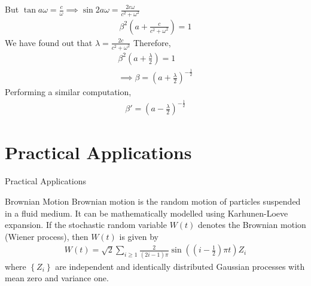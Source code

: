 \documentclass{beamer}
\providecommand{\brak}[1]{\ensuremath{\left(#1\right)}}
\providecommand{\cbrak}[1]{\ensuremath{\left\{#1\right\}}}
\begin{document}
	\begin{frame}
	But $\tan a\omega = \frac{c}{\omega} \implies \sin2 a\omega = \frac{2c\omega}{c^2+\omega^2}$
	\begin{align}
		\beta^2\brak{a + \frac{c}{c^2+\omega^2}} = 1
	\end{align}
	We have found out that $\lambda = \frac{2c}{c^2+\omega^2}$
	Therefore,
	\begin{align}
		\beta^2 \brak{a + \frac{\lambda}{2}} = 1 \\
		\implies \beta = \brak{a + \frac{\lambda}{2}}^{-\frac12}
	\end{align}
	Performing a similar computation,
	\begin{align}
		\beta' = \brak{a - \frac{\lambda}{2}}^{-\frac12}
	\end{align}
	\end{frame}
	
	\section{Practical Applications}
	\begin{frame}{Practical Applications}
	\begin{block}{Brownian Motion}
		Brownian motion is the random motion of particles suspended in a fluid medium. It 	can be mathematically modelled using Karhunen-Loeve expansion. If the stochastic random variable $W(t)$ denotes the Brownian motion (Wiener process), then $W(t)$ is given by
		\begin{align}
			W(t) = \sqrt{2} \sum_{i\ge1} \frac{2}{(2i-1)\pi} \sin\brak{(i - \frac12) \pi t} Z_i
		\end{align}
	where $\cbrak{Z_i}$ are independent and identically distributed Gaussian processes with mean zero and variance one. 	 
	\end{block}
	\end{frame}
\end{document}

